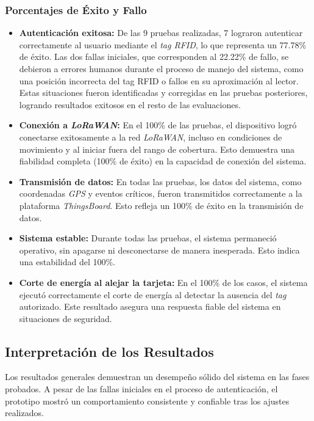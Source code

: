 \subsubsection{Porcentajes de Éxito y Fallo}

\begin{itemize}
    \item \textbf{Autenticación exitosa:} De las 9 pruebas realizadas, 7 lograron autenticar correctamente al usuario mediante el \textit{tag RFID}, lo que representa un 77.78\% de éxito. Las dos fallas iniciales, que corresponden al 22.22\% de fallo, se debieron a errores humanos durante el proceso de manejo del sistema, como una posición incorrecta del tag RFID o fallos en su aproximación al lector. Estas situaciones fueron identificadas y corregidas en las pruebas posteriores, logrando resultados exitosos en el resto de las evaluaciones. 
    \item \textbf{Conexión a \textit{LoRaWAN}:} En el 100\% de las pruebas, el dispositivo logró conectarse exitosamente a la red \textit{LoRaWAN}, incluso en condiciones de movimiento y al iniciar fuera del rango de cobertura. Esto demuestra una fiabilidad completa (100\% de éxito) en la capacidad de conexión del sistema.
    \item \textbf{Transmisión de datos:} En todas las pruebas, los datos del sistema, como coordenadas \textit{GPS} y eventos críticos, fueron transmitidos correctamente a la plataforma \textit{ThingsBoard}. Esto refleja un 100\% de éxito en la transmisión de datos.
    \item \textbf{Sistema estable:} Durante todas las pruebas, el sistema permaneció operativo, sin apagarse ni desconectarse de manera inesperada. Esto indica una estabilidad del 100\%.
    \item \textbf{Corte de energía al alejar la tarjeta:} En el 100\% de los casos, el sistema ejecutó correctamente el corte de energía al detectar la ausencia del \textit{tag} autorizado. Este resultado asegura una respuesta fiable del sistema en situaciones de seguridad.
\end{itemize}

\subsection{Interpretación de los Resultados}

Los resultados generales demuestran un desempeño sólido del sistema en las fases probados. A pesar de las fallas iniciales en el proceso de autenticación, el prototipo mostró un comportamiento consistente y confiable tras los ajustes realizados.

